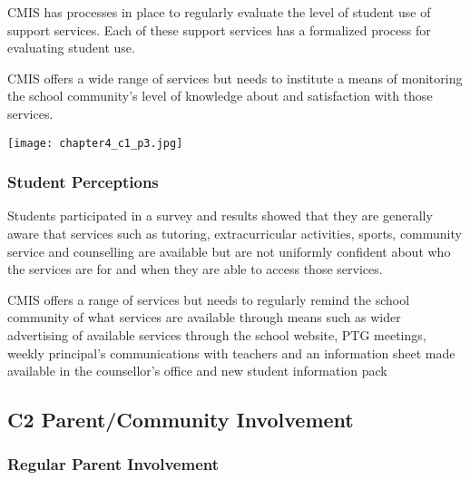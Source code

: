 \begin{findings}

CMIS has processes in place to regularly evaluate the level of student use of support services.  Each of these support services has a formalized process for evaluating student use.


CMIS offers a wide range of services but needs to institute a means of monitoring the school community’s level of knowledge about and satisfaction with those services.
\end{findings}

{\centering\texttt{[image: chapter4\_c1\_p3.jpg]}}

\subsubsection{Student Perceptions}



\begin{findings}
Students participated in a survey and results showed that they are generally aware that services such as tutoring, extracurricular activities, sports, community service and counselling are available but are not uniformly confident about who the services are for and when they are able to access those services.


CMIS offers a range of services but needs to regularly remind the school community of what services are available through means such as wider advertising of available services through the school website, PTG meetings, weekly principal’s communications with teachers and an information sheet made available in the counsellor’s office and new student information pack
\end{findings}

\subsection{C2 Parent/Community Involvement}

\subsubsection{Regular Parent Involvement}

